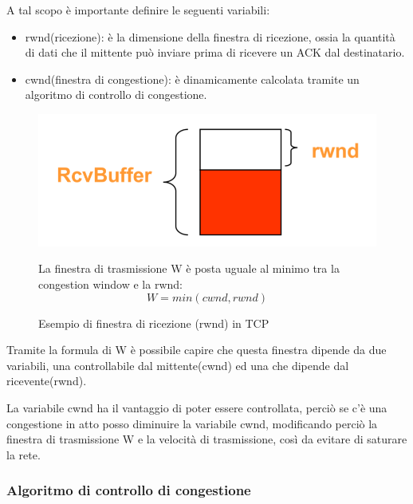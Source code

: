 A tal scopo è importante definire le seguenti variabili:
\begin{itemize}
    \item rwnd(ricezione): è la dimensione della finestra di ricezione, ossia la quantità di dati che il mittente può inviare prima di ricevere un ACK dal destinatario.  
    \item cwnd(finestra di congestione): è dinamicamente calcolata tramite un algoritmo di controllo di congestione. 
\end{itemize}
\begin{figure}[h!]
    \begin{minipage}{0.45\textwidth}
        \centering
        \includegraphics[width=\textwidth]{images/rwnd.png}
        \caption{Esempio di finestra di ricezione (rwnd) in TCP}
        \label{fig:rwnd}
    \end{minipage}
    \hfill
    \begin{minipage}{0.52\textwidth}
        \raggedright
        La finestra di trasmissione W è posta uguale al minimo tra la congestion window e la rwnd:
        \begin{equation}
            W = min(cwnd, rwnd)
        \end{equation}
        \raggedleft
    \end{minipage}
\end{figure}
Tramite la formula di W è possibile capire che questa finestra dipende da due variabili, una controllabile dal mittente(cwnd) ed una che dipende dal ricevente(rwnd).

La variabile cwnd ha il vantaggio di poter essere controllata, perciò se c'è una congestione in atto posso diminuire la variabile cwnd, modificando perciò la finestra di trasmissione W e la velocità di trasmissione, così da evitare di saturare la rete.

\subsubsection{Algoritmo di controllo di congestione}

